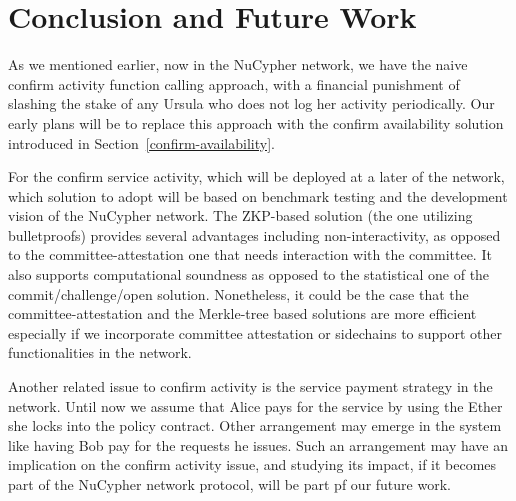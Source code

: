 \section{Conclusion and Future Work}
\label{discussion}
As we mentioned earlier, now in the NuCypher network, we have the naive confirm activity function calling approach, with a financial punishment of slashing the stake of any Ursula who does not log her activity periodically. Our early plans will be to replace this approach with the confirm availability solution introduced in Section~\ref{confirm-availability}.


For the confirm service activity, which will be deployed at a later of the network, which solution to adopt will be based on benchmark testing and the development vision of the NuCypher network. The ZKP-based solution (the one utilizing bulletproofs) provides several advantages including non-interactivity, as opposed to the committee-attestation one that needs interaction with the committee. It also supports computational soundness as opposed to the statistical one of the commit/challenge/open solution. Nonetheless, it could be the case that the committee-attestation and the Merkle-tree based solutions are more efficient especially if we incorporate committee attestation or sidechains to support other functionalities in the network. 


Another related issue to confirm activity is the service payment strategy in the network. Until now we assume that Alice pays for the service by using the Ether she locks into the policy contract. Other arrangement may emerge in the system like having Bob pay for the requests he issues. Such an arrangement may have an implication on the confirm activity issue, and studying its impact, if it becomes part of the NuCypher network protocol, will be part pf our future work.
